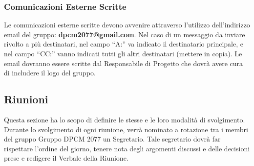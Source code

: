 \subsubsection{Comunicazioni Esterne Scritte}
Le comunicazioni esterne scritte devono avvenire attraverso l’utilizzo dell’indirizzo email del gruppo: \textbf{dpcm2077@gmail.com}. 
Nel caso di un messaggio da inviare rivolto a più destinatari, nel campo “A:” va indicato il destinatario principale, e nel campo “CC:” vanno indicati tutti gli altri destinatari (mettere in copia).
Le email dovranno essere scritte dal Responsabile di Progetto che dovrà avere cura di includere il logo del gruppo.

\subsection{Riunioni}
Questa sezione ha lo scopo di definire le stesse e le loro modalità di svolgimento. Durante lo svolgimento di ogni riunione, verrà nominato a rotazione tra i membri del gruppo Gruppo DPCM 2077 un Segretario. 
Tale segretario dovrà far rispettare l’ordine del giorno, tenere nota degli argomenti discussi e delle decisioni prese e redigere il Verbale della Riunione.

